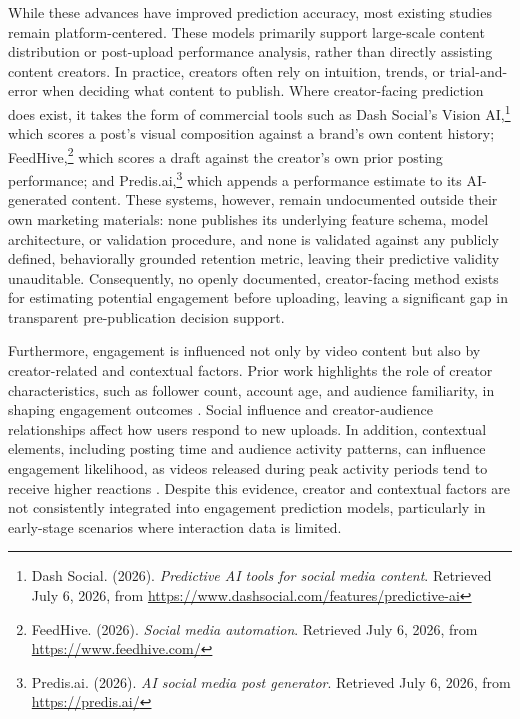 While these advances have improved prediction accuracy, most existing studies remain platform-centered. These models primarily support large-scale content distribution or post-upload performance analysis, rather than directly assisting content creators. In practice, creators often rely on intuition, trends, or trial-and-error when deciding what content to publish. Where creator-facing prediction does exist, it takes the form of
commercial tools such as Dash Social's Vision AI,\footnote{\label{fn:dashsocial}%
Dash Social. (2026). \textit{Predictive AI tools for social media content}. Retrieved July 6, 2026, from
\url{https://www.dashsocial.com/features/predictive-ai}} which scores a post's visual composition against a brand's own content history; FeedHive,\footnote{\label{fn:feedhive}%
FeedHive. (2026). \textit{Social media automation}. Retrieved July 6, 2026, from \url{https://www.feedhive.com/}} which scores a draft against the creator's own prior posting
performance; and Predis.ai,\footnote{\label{fn:predisai}%
Predis.ai. (2026). \textit{AI social media post generator}. Retrieved July 6, 2026, from \url{https://predis.ai/}} which appends a performance estimate to its AI-generated content. These systems, however, remain undocumented outside their own marketing materials: none publishes its underlying feature schema, model architecture, or validation procedure, and none is validated against any publicly defined, behaviorally grounded retention metric, leaving their predictive validity unauditable. Consequently, no openly documented, creator-facing method exists for estimating potential engagement before uploading, leaving a significant gap in transparent pre-publication decision support.

Furthermore, engagement is influenced not only by video content but also by creator-related and contextual factors. Prior work highlights the role of creator characteristics, such as follower count, account age, and audience familiarity, in shaping engagement outcomes \cite{peng2024untangling, sadeque2019predicting, zannettou2024analyzing}. Social influence and creator-audience relationships affect how users respond to new uploads. In addition, contextual elements, including posting time and audience activity patterns, can influence engagement likelihood, as videos released during peak activity periods tend to receive higher reactions \cite{kanuri2018scheduling, manic2024short, spasojevic2015post}. Despite this evidence, creator and contextual factors are not consistently integrated into engagement prediction models, particularly in early-stage scenarios where interaction data is limited.

